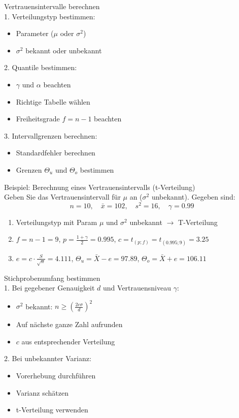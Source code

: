 \begin{KR}{Vertrauensintervalle berechnen}\\
1. Verteilungstyp bestimmen:
   \begin{itemize}
     \item Parameter ($\mu$ oder $\sigma^2$)
     \item $\sigma^2$ bekannt oder unbekannt
   \end{itemize}

2. Quantile bestimmen:
   \begin{itemize}
     \item $\gamma$ und $\alpha$ beachten
     \item Richtige Tabelle wählen
     \item Freiheitsgrade $f=n-1$ beachten
   \end{itemize}

3. Intervallgrenzen berechnen:
   \begin{itemize}
     \item Standardfehler berechnen
     \item Grenzen $\Theta_u$ und $\Theta_o$ bestimmen
   \end{itemize}
\end{KR}

\begin{example2}{Beispiel: Berechnung eines Vertrauensintervalls (t-Verteilung)}\\
Geben Sie das Vertrauensintervall für $\mu$ an ($\sigma^2$ unbekannt). Gegeben sind:
$$
n=10, \quad \bar{x}=102, \quad s^2=16, \quad \gamma=0.99
$$

\begin{enumerate}
  \item Verteilungstyp mit Param $\mu$ und $\sigma^2$ unbekannt $\rightarrow$ T-Verteilung
  \item $f=n-1=9$, $p=\frac{1+\gamma}{2}=0.995$, $c=t_{(p;f)}=t_{(0.995;9)}=3.25$
  \item $e=c \cdot \frac{S}{\sqrt{n}}=4.111$, $\Theta_u=\bar{X}-e=97.89$, $\Theta_o=\bar{X}+e=106.11$
\end{enumerate}
\end{example2}

\begin{KR}{Stichprobenumfang bestimmen}\\
1. Bei gegebener Genauigkeit $d$ und Vertrauensniveau $\gamma$:
   \begin{itemize}
     \item $\sigma^2$ bekannt: $n \geq (\frac{2c\sigma}{d})^2$
     \item Auf nächste ganze Zahl aufrunden
     \item $c$ aus entsprechender Verteilung
   \end{itemize}

2. Bei unbekannter Varianz:
   \begin{itemize}
     \item Vorerhebung durchführen
     \item Varianz schätzen
     \item t-Verteilung verwenden
   \end{itemize}
\end{KR}

